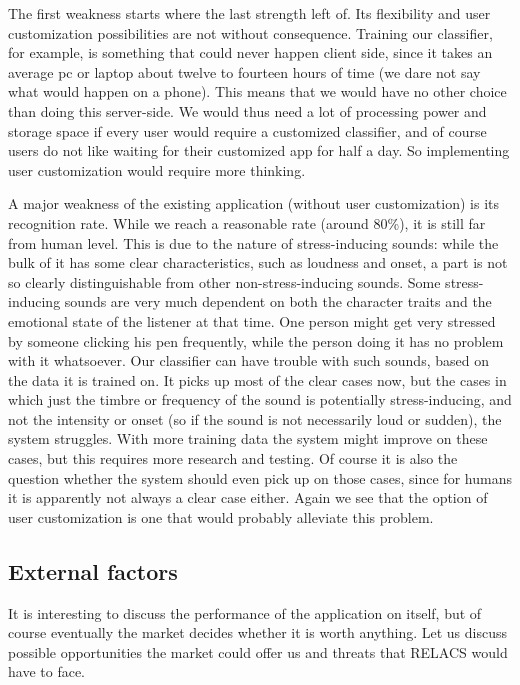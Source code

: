 \documentclass[a4paper]{article}
\begin{document}
The first weakness starts where the last strength left of. Its flexibility and user customization possibilities are not without consequence. Training our classifier, for example, is something that could never happen client side, since it takes an average pc or laptop about twelve to fourteen hours of time (we dare not say what would happen on a phone). This means that we would have no other choice than doing this server-side. We would thus need a lot of processing power and storage space if every user would require a customized classifier, and of course users do not like waiting for their customized app for half a day. So implementing user customization would require more thinking.

A major weakness of the existing application (without user customization) is its recognition rate. While we reach a reasonable rate (around 80\%), it is still far from human level. This is due to the nature of stress-inducing sounds: while the bulk of it has some clear characteristics, such as loudness and onset, a part is not so clearly distinguishable from other non-stress-inducing sounds. Some stress-inducing sounds are very much dependent on both the character traits and the emotional state of the listener at that time. One person might get very stressed by someone clicking his pen frequently, while the person doing it has no problem with it whatsoever. Our classifier can have trouble with such sounds, based on the data it is trained on. It picks up most of the clear cases now, but the cases in which just the timbre or frequency of the sound is potentially stress-inducing, and not the intensity or onset (so if the sound is not necessarily loud or sudden), the system struggles. With more training data the system might improve on these cases, but this requires more research and testing. Of course it is also the question whether the system should even pick up on those cases, since for humans it is apparently not always a clear case either. Again we see that the option of user customization is one that would probably alleviate this problem.

\subsection{External factors}
It is interesting to discuss the performance of the application on itself, but of course eventually the market decides whether it is worth anything. Let us discuss possible opportunities the market could offer us and threats that RELACS would have to face.
\end{document}

